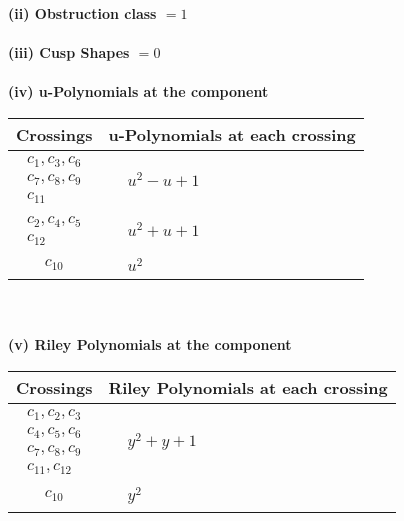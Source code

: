 \documentclass[1p]{elsarticle_modified}
\theoremstyle{definition}
\begin{document}
\flushleft \textbf{(ii) Obstruction class $= 1$}\\~\\
\flushleft \textbf{(iii) Cusp Shapes $= 0$}\\~\\
\newpage\renewcommand{\arraystretch}{1}
\flushleft \textbf{(iv) u-Polynomials at the component}\newline \\
\begin{tabular}{m{50pt}|m{274pt}}
Crossings & \hspace{64pt}u-Polynomials at each crossing \\
\hline $$\begin{aligned}c_{1},c_{3},c_{6}\\c_{7},c_{8},c_{9}\\c_{11}\end{aligned}$$&$\begin{aligned}
&u^2- u+1
\end{aligned}$\\
\hline $$\begin{aligned}c_{2},c_{4},c_{5}\\c_{12}\end{aligned}$$&$\begin{aligned}
&u^2+u+1
\end{aligned}$\\
\hline $$\begin{aligned}c_{10}\end{aligned}$$&$\begin{aligned}
&u^2
\end{aligned}$\\
\hline
\end{tabular}\\~\\
\newpage\renewcommand{\arraystretch}{1}
\flushleft \textbf{(v) Riley Polynomials at the component}\newline \\
\begin{tabular}{m{50pt}|m{274pt}}
Crossings & \hspace{64pt}Riley Polynomials at each crossing \\
\hline $$\begin{aligned}c_{1},c_{2},c_{3}\\c_{4},c_{5},c_{6}\\c_{7},c_{8},c_{9}\\c_{11},c_{12}\end{aligned}$$&$\begin{aligned}
&y^2+y+1
\end{aligned}$\\
\hline $$\begin{aligned}c_{10}\end{aligned}$$&$\begin{aligned}
&y^2
\end{aligned}$\\
\hline
\end{tabular}\\~\\
\end{document}
